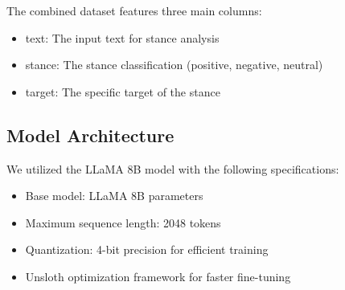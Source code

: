 \documentclass[twocolumn]{article}
\begin{document}
The combined dataset features three main columns:
\begin{itemize}
    \item text: The input text for stance analysis
    \item stance: The stance classification (positive, negative, neutral)
    \item target: The specific target of the stance
\end{itemize}

\subsection{Model Architecture}
We utilized the LLaMA 8B model with the following specifications:
\begin{itemize}
    \item Base model: LLaMA 8B parameters
    \item Maximum sequence length: 2048 tokens
    \item Quantization: 4-bit precision for efficient training
    \item Unsloth optimization framework for faster fine-tuning
\end{itemize}

\end{document}
